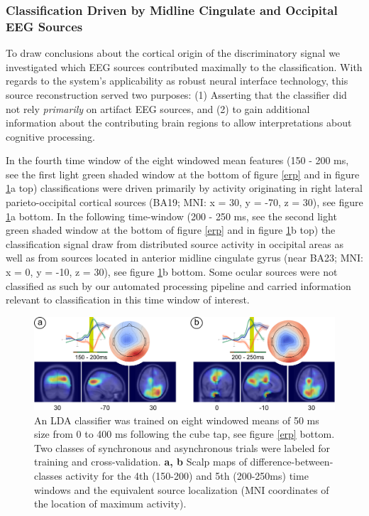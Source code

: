 \subsubsection{Classification Driven by Midline Cingulate and Occipital EEG Sources}

To draw conclusions about the cortical origin of the discriminatory signal we investigated which EEG sources contributed maximally to the classification. With regards to the system's applicability as robust neural interface technology, this source reconstruction served two purposes: (1) Asserting that the classifier did not rely \textit{primarily} on artifact EEG sources, and (2) to gain additional information about the contributing brain regions to allow interpretations about cognitive processing.

In the fourth time window of the eight windowed mean features (150 - 200 ms, see the first light green shaded window at the bottom of figure \ref{erp} and in figure \ref{lda_loc}a top) classifications were driven primarily by activity originating in right lateral parieto-occipital cortical sources (BA19; MNI: x = 30, y = -70, z = 30), see figure \ref{lda_loc}a bottom. In the following time-window (200 - 250 ms, see the second light green shaded window at the bottom of figure \ref{erp} and in figure \ref{lda_loc}b top) the classification signal draw from distributed source activity in occipital areas as well as from sources located in anterior midline cingulate gyrus (near BA23; MNI: x = 0, y = -10, z = 30), see figure \ref{lda_loc}b bottom. Some ocular sources were not classified as such by our automated processing pipeline and carried information relevant to classification in this time window of interest.

\begin{figure}[!h]
  \includegraphics[width=\textwidth]{figures/fig_localization.jpg}
  \caption{An LDA classifier was trained on eight windowed means of 50 ms size from 0 to 400 ms following the cube tap, see figure \ref{erp} bottom. Two classes of synchronous and asynchronous trials were labeled for training and cross-validation. \textbf{a, b} Scalp maps of difference-between-classes activity for the 4th (150-200) and 5th (200-250ms) time windows and the equivalent source localization (MNI coordinates of the location of maximum activity).}
  \label{lda_loc}
\end{figure}
